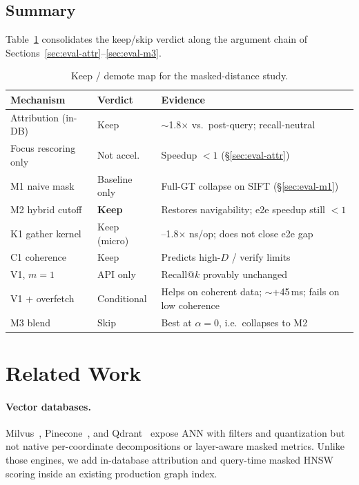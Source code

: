 \documentclass[sigconf,review,balance=false]{acmart}
\begin{document}
\subsection{Summary}

Table~\ref{tab:keep} consolidates the keep/skip verdict along the argument
chain of Sections~\ref{sec:eval-attr}--\ref{sec:eval-m3}.

\begin{table}[htbp]
  \centering
  \caption{Keep / demote map for the masked-distance study.}
  \label{tab:keep}
  \footnotesize
  \setlength{\tabcolsep}{3pt}
  \begin{tabular}{@{}>{\raggedright\arraybackslash}p{}
                     >{\raggedright\arraybackslash}p{}
                     >{\raggedright\arraybackslash}p{}@{}}
    \hline
    \textbf{Mechanism} & \textbf{Verdict} & \textbf{Evidence} \\
    \hline
    Attribution (in-DB) & Keep & $\sim$1.8$\times$ vs.\ post-query; recall-neutral \\
    Focus rescoring only & Not accel. & Speedup $<1$ (\S\ref{sec:eval-attr}) \\
    M1 naive mask & Baseline only & Full-GT collapse on SIFT (\S\ref{sec:eval-m1}) \\
    M2 hybrid cutoff & \textbf{Keep} & Restores navigability; e2e speedup still $<1$ \\
    K1 gather kernel & Keep (micro) & 1.1--1.8$\times$ ns/op; does not close e2e gap \\
    C1 coherence & Keep & Predicts high-$D$ / verify limits \\
    V1, $m{=}1$ & API only & Recall@$k$ provably unchanged \\
    V1 + overfetch & Conditional & Helps on coherent data; $\sim$+45\,ms; fails on low coherence \\
    M3 blend & Skip & Best at $\alpha{=}0$, i.e.\ collapses to M2 \\
    \hline
  \end{tabular}
\end{table}

\section{Related Work}
\label{sec:related}

\paragraph{Vector databases.} Milvus~\cite{wang2021milvus},
Pinecone~\cite{pinecone2023}, and Qdrant~\cite{qdrant2024} expose ANN with
filters and quantization but not native per-coordinate decompositions or
layer-aware masked metrics.
Unlike those engines, we add in-database attribution and query-time masked
HNSW scoring inside an existing production graph index.
\end{document}
